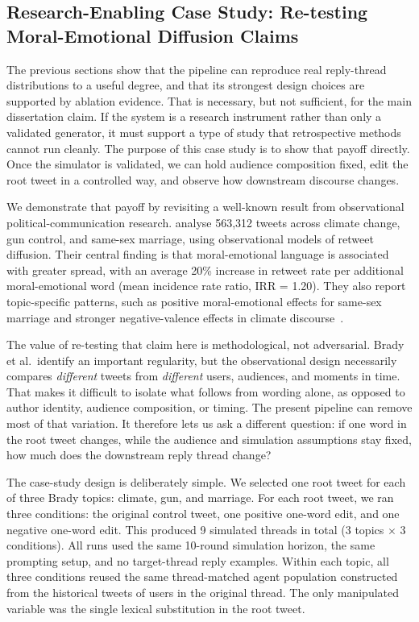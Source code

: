 \documentclass[logo,bsc,singlespacing,parskip,online]{infthesis}
\begin{document}
\subsection{Research-Enabling Case Study: Re-testing Moral-Emotional Diffusion Claims}

The previous sections show that the pipeline can reproduce real reply-thread distributions to a useful degree, and that its strongest design choices are supported by ablation evidence. That is necessary, but not sufficient, for the main dissertation claim. If the system is a research instrument rather than only a validated generator, it must support a type of study that retrospective methods cannot run cleanly. The purpose of this case study is to show that payoff directly. Once the simulator is validated, we can hold audience composition fixed, edit the root tweet in a controlled way, and observe how downstream discourse changes.

We demonstrate that payoff by revisiting a well-known result from observational political-communication research. \citet{brady2017emotion} analyse 563,312 tweets across climate change, gun control, and same-sex marriage, using observational models of retweet diffusion. Their central finding is that moral-emotional language is associated with greater spread, with an average 20\% increase in retweet rate per additional moral-emotional word (mean incidence rate ratio, IRR = 1.20). They also report topic-specific patterns, such as positive moral-emotional effects for same-sex marriage and stronger negative-valence effects in climate discourse~\citep{brady2017emotion}.

The value of re-testing that claim here is methodological, not adversarial. Brady et al.\ identify an important regularity, but the observational design necessarily compares \emph{different} tweets from \emph{different} users, audiences, and moments in time. That makes it difficult to isolate what follows from wording alone, as opposed to author identity, audience composition, or timing. The present pipeline can remove most of that variation. It therefore lets us ask a different question: if one word in the root tweet changes, while the audience and simulation assumptions stay fixed, how much does the downstream reply thread change?

The case-study design is deliberately simple. We selected one root tweet for each of three Brady topics: climate, gun, and marriage. For each root tweet, we ran three conditions: the original control tweet, one positive one-word edit, and one negative one-word edit. This produced 9 simulated threads in total (3 topics $\times$ 3 conditions). All runs used the same 10-round simulation horizon, the same prompting setup, and no target-thread reply examples. Within each topic, all three conditions reused the same thread-matched agent population constructed from the historical tweets of users in the original thread. The only manipulated variable was the single lexical substitution in the root tweet.
\end{document}
